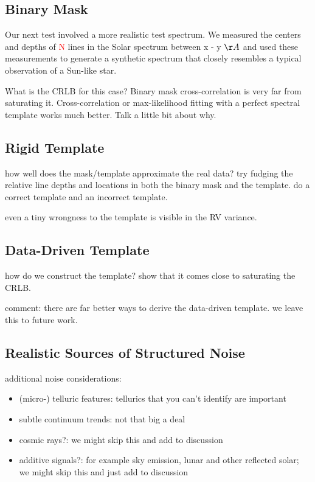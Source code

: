 \documentclass[modern]{aastex61}
\newcommand{\todo}[1]{\textcolor{red}{#1}}  %
\begin{document}
\subsection{Binary Mask}

Our next test involved a more realistic test spectrum. We measured the centers and depths of \todo{N} lines in the Solar spectrum between {x - y} $\AA$ and used these measurements to generate a synthetic spectrum that closely resembles a typical observation of a Sun-like star.

What is the CRLB for this case? Binary mask cross-correlation is very far from saturating it. Cross-correlation or max-likelihood fitting with a perfect spectral template works much better. Talk a little bit about why.

\subsection{Rigid Template}

how well does the mask/template approximate the real data? try fudging the relative line depths and locations in both the binary mask and the template. do a correct template and an incorrect template.

even a tiny wrongness to the template is visible in the RV variance.

\subsection{Data-Driven Template}

how do we construct the template? show that it comes close to saturating the CRLB.

comment: there are far better ways to derive the data-driven template. we leave this to future work.

\subsection{Realistic Sources of Structured Noise}

additional noise considerations:
\begin{itemize}
\item (micro-) telluric features: tellurics that you can't identify are important
\item subtle continuum trends: not that big a deal
\item cosmic rays?: we might skip this and add to discussion
\item additive signals?: for example sky emission, lunar and other reflected solar; we might skip this and just add to discussion
\end{itemize}
\end{document}
